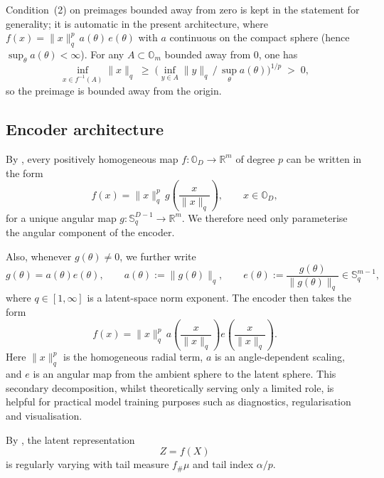 \begin{remark}
\label{rmk:hypothesis-2-automatic}
Condition~(2) on preimages bounded away from zero is kept in the statement for generality; it is automatic in the present architecture, where \(f(x)=\|x\|_q^{p}\,a(\theta)\,e(\theta)\) with \(a\) continuous on the compact sphere (hence \(\sup_\theta a(\theta)<\infty\)). For any \(A\subset\mathbb{O}_m\) bounded away from \(0\), one has
\[
\inf_{x\in f^{-1}(A)}\|x\|_q
\;\geq\;
\bigl(\inf_{y\in A}\|y\|_q \,\big/\, \sup_\theta a(\theta)\bigr)^{1/p}
\;>\;0,
\]
so the preimage is bounded away from the origin.
\end{remark}

\subsection{Encoder architecture}
\label{sec:encoder-architecture}

By , every positively homogeneous map \(f:\mathbb{O}_D\to\mathbb{R}^m\) of degree \(p\) can be written in the form
\[
f(x)=\|x\|_{q}^p\,g\!\left(\frac{x}{\|x\|_{q}}\right),
\qquad x\in\mathbb{O}_D,
\]
for a unique angular map \(g:\mathbb{S}^{D-1}_{q}\to\mathbb{R}^m\). We therefore need only parameterise the angular component of the encoder.

Also, whenever \(g(\theta)\neq 0\), we further write
\[
g(\theta)=a(\theta)e(\theta),
\qquad
a(\theta):=\|g(\theta)\|_{q},
\qquad
e(\theta):=\frac{g(\theta)}{\|g(\theta)\|_{q}}\in\mathbb{S}^{m-1}_{q},
\]
where \(q\in[1,\infty]\) is a latent-space norm exponent. The encoder then takes the form
\[
f(x)
=
\|x\|_{q}^p\,
a\!\left(\frac{x}{\|x\|_{q}}\right)
e\!\left(\frac{x}{\|x\|_{q}}\right).
\]
Here \(\|x\|_{q}^p\) is the homogeneous radial term, \(a\) is an angle-dependent scaling, and \(e\) is an angular map from the ambient sphere to the latent sphere. This secondary decomposition, whilst theoretically serving only a limited role, is helpful for practical model training purposes such as diagnostics, regularisation and visualisation.

By , the latent representation
\[
Z=f(X)
\]
is regularly varying with tail measure \(f_{\#}\mu\) and tail index \(\alpha/p\).

